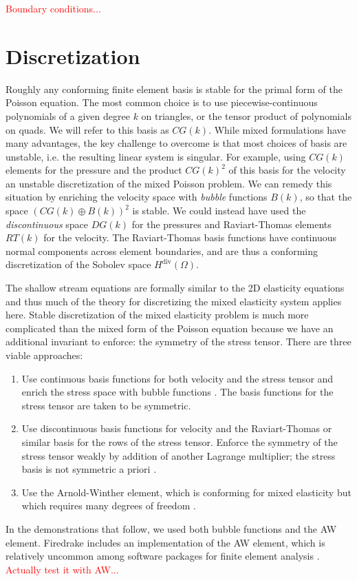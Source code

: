 \documentclass{article}
\theoremstyle{definition}
\theoremstyle{plain}
\begin{document}
\textcolor{red}{Boundary conditions...}


\section{Discretization}

Roughly any conforming finite element basis is stable for the primal form of the Poisson equation.
The most common choice is to use piecewise-continuous polynomials of a given degree $k$ on triangles, or the tensor product of polynomials on quads.
We will refer to this basis as $CG(k)$.
While mixed formulations have many advantages, the key challenge to overcome is that most choices of basis are unstable, i.e. the resulting linear system is singular.
For example, using $CG(k)$ elements for the pressure and the product $CG(k)^2$ of this basis for the velocity an unstable discretization of the mixed Poisson problem.
We can remedy this situation by enriching the velocity space with \emph{bubble} functions $B(k)$, so that the space $(CG(k) \oplus B(k))^2$ is stable.
We could instead have used the \emph{discontinuous} space $DG(k)$ for the pressures and Raviart-Thomas elements $RT(k)$ for the velocity.
The Raviart-Thomas basis functions have continuous normal components across element boundaries, and are thus a conforming discretization of the Sobolev space $H^{\text{div}}(\Omega)$.

The shallow stream equations are formally similar to the 2D elasticity equations and thus much of the theory for discretizing the mixed elasticity system applies here.
Stable discretization of the mixed elasticity problem is much more complicated than the mixed form of the Poisson equation because we have an additional invariant to enforce: the symmetry of the stress tensor.
There are three viable approaches:
\begin{enumerate}
    \item Use continuous basis functions for both velocity and the stress tensor and enrich the stress space with bubble functions \citep{brezzi1993mixed}.
        The basis functions for the stress tensor are taken to be symmetric.
    \item Use discontinuous basis functions for velocity and the Raviart-Thomas or similar basis for the rows of the stress tensor.
        Enforce the symmetry of the stress tensor weakly by addition of another Lagrange multiplier; the stress basis is not symmetric a priori \citep{arnold1984peers}.
    \item Use the Arnold-Winther element, which is conforming for mixed elasticity but which requires many degrees of freedom \citep{arnold2002mixed}.
\end{enumerate}
In the demonstrations that follow, we used both bubble functions and the AW element.
Firedrake includes an implementation of the AW element, which is relatively uncommon among software packages for finite element analysis \citep{aznaran2021transformations}.
\textcolor{red}{Actually test it with AW...}
\end{document}
